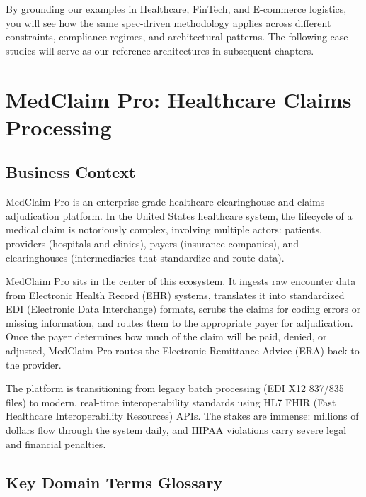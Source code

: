 \documentclass[
  11pt,
  openany,
  oneside]{book}
\begin{document}
By grounding our examples in Healthcare, FinTech, and E-commerce
logistics, you will see how the same spec-driven methodology applies
across different constraints, compliance regimes, and architectural
patterns. The following case studies will serve as our reference
architectures in subsequent chapters.

\section{MedClaim Pro: Healthcare Claims
Processing}\label{medclaim-pro-healthcare-claims-processing}

\subsection{Business Context}\label{business-context}

MedClaim Pro is an enterprise-grade healthcare clearinghouse and claims
adjudication platform. In the United States healthcare system, the
lifecycle of a medical claim is notoriously complex, involving multiple
actors: patients, providers (hospitals and clinics), payers (insurance
companies), and clearinghouses (intermediaries that standardize and
route data).

MedClaim Pro sits in the center of this ecosystem. It ingests raw
encounter data from Electronic Health Record (EHR) systems, translates
it into standardized EDI (Electronic Data Interchange) formats, scrubs
the claims for coding errors or missing information, and routes them to
the appropriate payer for adjudication. Once the payer determines how
much of the claim will be paid, denied, or adjusted, MedClaim Pro routes
the Electronic Remittance Advice (ERA) back to the provider.

The platform is transitioning from legacy batch processing (EDI X12
837/835 files) to modern, real-time interoperability standards using HL7
FHIR (Fast Healthcare Interoperability Resources) APIs. The stakes are
immense: millions of dollars flow through the system daily, and HIPAA
violations carry severe legal and financial penalties.

\subsection{Key Domain Terms Glossary}\label{key-domain-terms-glossary}
\end{document}

